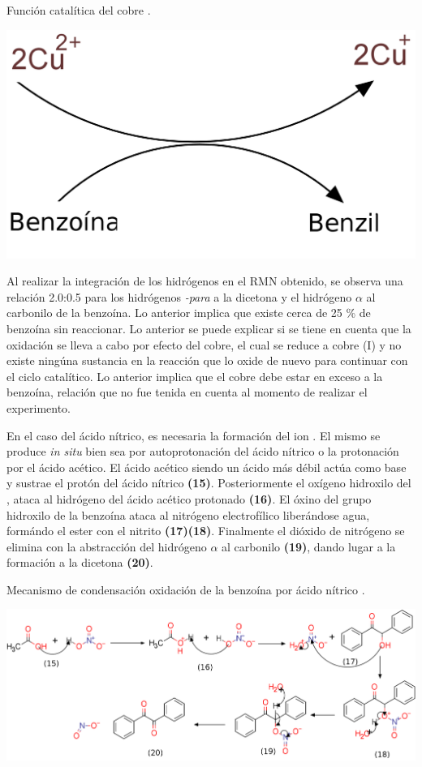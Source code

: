 \documentclass[fleqn,10pt]{SelfArx}
\begin{document}
\begin{scheme}[h]
	\centering
	\caption{Funci\'on catal\'itica del cobre \cite{wigal2000}.}
	\includegraphics[width=0.5\linewidth]{structures/coppercycle.png}
\end{scheme}
\pagebreak
Al realizar la integraci\'on de los hidr\'ogenos en el RMN obtenido, se observa una relaci\'on 2.0:0.5 para los hidr\'ogenos \textit{-para} a la dicetona y el hidr\'ogeno $\alpha$ al carbonilo de la benzo\'ina. Lo anterior implica que existe cerca de 25 \% de benzo\'ina sin reaccionar. Lo anterior se puede explicar si se tiene en cuenta que la oxidaci\'on se lleva a cabo por efecto del cobre, el cual se reduce a cobre (I) y no existe ning\'una sustancia en la reacci\'on que lo oxide de nuevo para continuar con el ciclo catal\'itico. Lo anterior implica que el cobre debe estar en exceso a la benzo\'ina, relaci\'on que no fue tenida en cuenta al momento de realizar el experimento.

En el caso del \'acido n\'itrico, es necesaria la formaci\'on del ion . El mismo se produce \textit{in situ} bien sea por autoprotonaci\'on del \'acido n\'itrico o la protonaci\'on por el \'acido ac\'etico. El \'acido ac\'etico siendo un \'acido m\'as d\'ebil act\'ua como base y sustrae el prot\'on del \'acido n\'itrico \textbf{(15)}. Posteriormente el ox\'igeno hidroxilo del , ataca al hidr\'ogeno del \'acido ac\'etico protonado \textbf{(16)}. El \'oxino del grupo hidroxilo de la benzo\'ina ataca al nitr\'ogeno electrof\'ilico liber\'andose agua, form\'ando el ester con el nitrito \textbf{(17)(18)}. Finalmente el di\'oxido de nitr\'ogeno se elimina con la abstracci\'on del hidr\'ogeno $\alpha$ al carbonilo \textbf{(19)}, dando lugar a la formaci\'on a la dicetona \textbf{(20)}.
\begin{scheme}[h]
	\centering
	\caption{Mecanismo de condensaci\'on oxidaci\'on de la benzo\'ina por \'acido n\'itrico \cite{pavia2010}.}
	\includegraphics[width=\linewidth]{structures/mechanism-oxidation.png}
\end{scheme}
\end{document}
